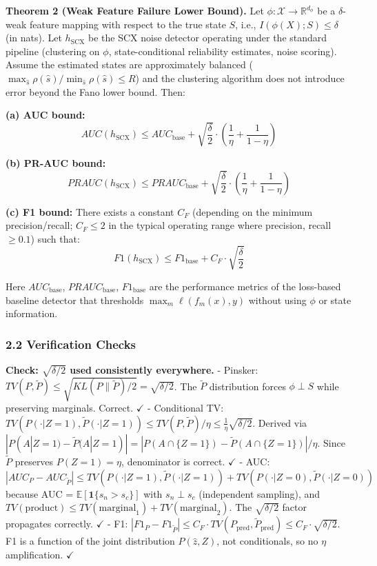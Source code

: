 \documentclass[
  12pt,
]{ctexart}
\begin{document}
\textbf{Theorem 2 (Weak Feature Failure Lower Bound).} Let
\(\phi: \mathcal{X} \to \mathbb{R}^{d_\phi}\) be a \(\delta\)-weak
feature mapping with respect to the true state \(S\), i.e.,
\(I(\phi(X); S) \leq \delta\) (in nats). Let \(h_{\text{SCX}}\) be the
SCX noise detector operating under the standard pipeline (clustering on
\(\phi\), state-conditional reliability estimates, noise scoring).
Assume the estimated states are approximately balanced
(\(\max_{\hat{s}} \rho(\hat{s}) / \min_{\hat{s}} \rho(\hat{s}) \leq R\))
and the clustering algorithm does not introduce error beyond the Fano
lower bound. Then:

\textbf{(a) AUC bound:}
\[\boxed{\;AUC(h_{\text{SCX}}) \leq AUC_{\text{base}} + \sqrt{\frac{\delta}{2}} \cdot \left(\frac{1}{\eta} + \frac{1}{1-\eta}\right)\;}\]

\textbf{(b) PR-AUC bound:}
\[\boxed{\;PRAUC(h_{\text{SCX}}) \leq PRAUC_{\text{base}} + \sqrt{\frac{\delta}{2}} \cdot \left(\frac{1}{\eta} + \frac{1}{1-\eta}\right)\;}\]

\textbf{(c) F1 bound:} There exists a constant \(C_F\) (depending on the
minimum precision/recall; \(C_F \leq 2\) in the typical operating range
where precision, recall \(\geq 0.1\)) such that:
\[\boxed{\;F1(h_{\text{SCX}}) \leq F1_{\text{base}} + C_F \cdot \sqrt{\frac{\delta}{2}}\;}\]

Here \(AUC_{\text{base}}\), \(PRAUC_{\text{base}}\),
\(F1_{\text{base}}\) are the performance metrics of the loss-based
baseline detector that thresholds \(\max_m \ell(f_m(x), y)\) without
using \(\phi\) or state information.

\subsubsection{2.2 Verification Checks}\label{verification-checks-1}

\textbf{Check: \(\sqrt{\delta/2}\) used consistently everywhere.} -
Pinsker:
\(TV(P, \tilde{P}) \leq \sqrt{KL(P\|\tilde{P})/2} = \sqrt{\delta/2}\).
The \(\tilde{P}\) distribution forces \(\phi \perp S\) while preserving
marginals. Correct. \(\checkmark\) - Conditional TV:
\(TV(P(\cdot|Z=1), \tilde{P}(\cdot|Z=1)) \leq TV(P, \tilde{P}) / \eta \leq \frac{1}{\eta}\sqrt{\delta/2}\).
Derived via
\(|P(A|Z=1) - \tilde{P}(A|Z=1)| = |P(A\cap\{Z=1\}) - \tilde{P}(A\cap\{Z=1\})|/\eta\).
Since \(\tilde{P}\) preserves \(P(Z=1) = \eta\), denominator is correct.
\(\checkmark\) - AUC:
\(|AUC_P - AUC_{\tilde{P}}| \leq TV(P(\cdot|Z=1), \tilde{P}(\cdot|Z=1)) + TV(P(\cdot|Z=0), \tilde{P}(\cdot|Z=0))\)
because AUC = \(\mathbb{E}[\mathbf{1}\{s_n > s_c\}]\) with
\(s_n \perp s_c\) (independent sampling), and
\(TV(\text{product}) \leq TV(\text{marginal}_1) + TV(\text{marginal}_2)\).
The \(\sqrt{\delta/2}\) factor propagates correctly. \(\checkmark\) -
F1:
\(|F1_P - F1_{\tilde{P}}| \leq C_F \cdot TV(P_{\text{pred}}, \tilde{P}_{\text{pred}}) \leq C_F \cdot \sqrt{\delta/2}\).
F1 is a function of the joint distribution \(P(\hat{z}, Z)\), not
conditionals, so no \(\eta\) amplification. \(\checkmark\)
\end{document}
